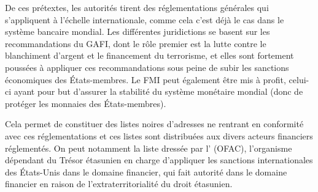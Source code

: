 De ces prétextes, les autorités tirent des réglementations générales qui s'appliquent à l'échelle internationale, comme cela c'est déjà le cas dans le système bancaire mondial. Les différentes juridictions se basent sur les recommandations du GAFI, dont le rôle premier est la lutte contre le blanchiment d'argent et le financement du terrorisme, et elles sont fortement poussées à appliquer ces recommandations sous peine de subir les sanctions économiques des États-membres. Le FMI peut également être mis à profit, celui-ci ayant pour but d'assurer la stabilité du système monétaire mondial (donc de protéger les monnaies des États-membres).

Cela permet de constituer des listes noires d'adresses ne rentrant en conformité avec ces réglementations et ces listes sont distribuées aux divers acteurs financiers réglementés. On peut notamment la liste dressée par l' (OFAC), l'organisme dépendant du Trésor étasunien en charge d'appliquer les sanctions internationales des États-Unis dans le domaine financier, qui fait autorité dans le domaine financier en raison de l'extraterritorialité du droit étasunien.


